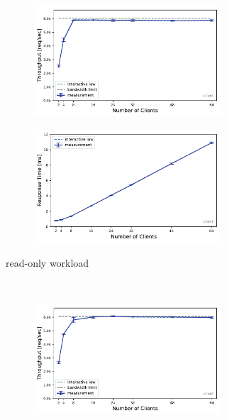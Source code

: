 \documentclass[report.tex]{subfiles}
\begin{document}
\begin{figure}[H]
\begin{subfigure}{\linewidth}
	\begin{subfigure}[b]{.49\linewidth}
		\centering
		\includegraphics[width=\linewidth]{data/exp22_ro_tp_nc.pdf}
	\end{subfigure}\hfill
	\begin{subfigure}[b]{.49\linewidth}
		\centering
		\includegraphics[width=\linewidth]{data/exp22_ro_rt_nc.pdf}
	\end{subfigure}%
	\caption{read-only workload}
	\label{exp22_ro_nc}
\end{subfigure}
\\[1ex]
\begin{subfigure}{\linewidth}
	\begin{subfigure}[b]{.49\linewidth}
		\centering
		\includegraphics[width=\linewidth]{data/exp22_wo_tp_nc.pdf}

\end{subfigure}
\end{subfigure}
\end{figure}
\end{document}
